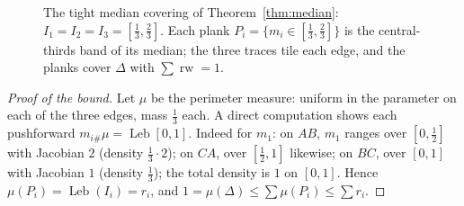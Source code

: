 \documentclass[11pt,reqno]{amsart}
\theoremstyle{plain}
\theoremstyle{definition}
\theoremstyle{remark}
\newcommand{\rw}{\operatorname{rw}}
\newcommand{\Leb}{\operatorname{Leb}}
\begin{document}
\begin{figure}[ht]
\centering
{}
\caption{The tight median covering of Theorem~\ref{thm:median}:
$I_1=I_2=I_3=[\tfrac13,\tfrac23]$. Each plank $P_i=\{m_i\in[\tfrac13,\tfrac23]\}$
is the central-thirds band of its median; the three traces tile each edge, and
the planks cover $\Delta$ with $\sum\rw=1$.}
\label{fig:median}
\end{figure}
\begin{proof}[Proof of the bound]
Let $\mu$ be the perimeter measure: uniform in the parameter on each of the three
edges, mass $\tfrac13$ each. A direct computation shows each pushforward
$m_{i\#}\mu=\Leb[0,1]$. Indeed for $m_1$: on $AB$, $m_1$ ranges over $[0,\tfrac12]$
with Jacobian $2$ (density $\tfrac13\cdot2$); on $CA$, over $[\tfrac12,1]$ likewise;
on $BC$, over $[0,1]$ with Jacobian $1$ (density $\tfrac13$); the total density is
$1$ on $[0,1]$. Hence $\mu(P_i)=\Leb(I_i)=r_i$,
and $1=\mu(\Delta)\le\sum\mu(P_i)\le\sum r_i$.
\end{proof}
\end{document}
